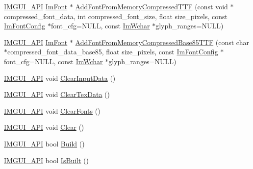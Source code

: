 \begin{DoxyCompactItemize}
\mbox{\hyperlink{imgui_8h_a43829975e84e45d1149597467a14bbf5}{I\+M\+G\+U\+I\+\_\+\+A\+PI}} \mbox{\hyperlink{struct_im_font}{Im\+Font}} $\ast$ \mbox{\hyperlink{struct_im_font_atlas_a579bb434bd116ea9ac4f892652ccefdb}{Add\+Font\+From\+Memory\+Compressed\+T\+TF}} (const void $\ast$compressed\+\_\+font\+\_\+data, int compressed\+\_\+font\+\_\+size, float size\+\_\+pixels, const \mbox{\hyperlink{struct_im_font_config}{Im\+Font\+Config}} $\ast$font\+\_\+cfg=N\+U\+LL, const \mbox{\hyperlink{imgui_8h_af2c7badaf05a0008e15ef76d40875e97}{Im\+Wchar}} $\ast$glyph\+\_\+ranges=N\+U\+LL)
\item 
\mbox{\hyperlink{imgui_8h_a43829975e84e45d1149597467a14bbf5}{I\+M\+G\+U\+I\+\_\+\+A\+PI}} \mbox{\hyperlink{struct_im_font}{Im\+Font}} $\ast$ \mbox{\hyperlink{struct_im_font_atlas_ab43b930beb57c0b998f42f4586677956}{Add\+Font\+From\+Memory\+Compressed\+Base85\+T\+TF}} (const char $\ast$compressed\+\_\+font\+\_\+data\+\_\+base85, float size\+\_\+pixels, const \mbox{\hyperlink{struct_im_font_config}{Im\+Font\+Config}} $\ast$font\+\_\+cfg=N\+U\+LL, const \mbox{\hyperlink{imgui_8h_af2c7badaf05a0008e15ef76d40875e97}{Im\+Wchar}} $\ast$glyph\+\_\+ranges=N\+U\+LL)
\item 
\mbox{\hyperlink{imgui_8h_a43829975e84e45d1149597467a14bbf5}{I\+M\+G\+U\+I\+\_\+\+A\+PI}} void \mbox{\hyperlink{struct_im_font_atlas_a3f5bcbb7a2683b1af106fcf4e1217662}{Clear\+Input\+Data}} ()
\item 
\mbox{\hyperlink{imgui_8h_a43829975e84e45d1149597467a14bbf5}{I\+M\+G\+U\+I\+\_\+\+A\+PI}} void \mbox{\hyperlink{struct_im_font_atlas_a3ede4bd513bec044c77ac392ad9c6e86}{Clear\+Tex\+Data}} ()
\item 
\mbox{\hyperlink{imgui_8h_a43829975e84e45d1149597467a14bbf5}{I\+M\+G\+U\+I\+\_\+\+A\+PI}} void \mbox{\hyperlink{struct_im_font_atlas_ad5c2560d708bd0c389e9bd9da2d9b055}{Clear\+Fonts}} ()
\item 
\mbox{\hyperlink{imgui_8h_a43829975e84e45d1149597467a14bbf5}{I\+M\+G\+U\+I\+\_\+\+A\+PI}} void \mbox{\hyperlink{struct_im_font_atlas_a8f6d01c671d8670f991ba651bbaf7e77}{Clear}} ()
\item 
\mbox{\hyperlink{imgui_8h_a43829975e84e45d1149597467a14bbf5}{I\+M\+G\+U\+I\+\_\+\+A\+PI}} bool \mbox{\hyperlink{struct_im_font_atlas_a81e39e30dffa4dd7e458a53297451e27}{Build}} ()
\item 
\mbox{\hyperlink{imgui_8h_a43829975e84e45d1149597467a14bbf5}{I\+M\+G\+U\+I\+\_\+\+A\+PI}} bool \mbox{\hyperlink{struct_im_font_atlas_a1819275e3e52fe14824454490b502250}{Is\+Built}} ()
\item 

\end{DoxyCompactItemize}
